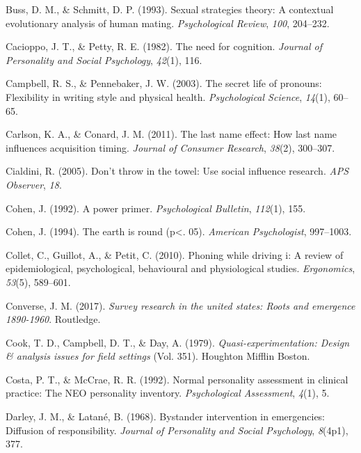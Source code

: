 \documentclass[
]{krantz}
\newlength{\cslhangindent}
\newenvironment{CSLReferences}[2] %
 {\begin{list}{}{%
  \setlength{\itemindent}{0pt}
  \setlength{\leftmargin}{0pt}
  \setlength{\parsep}{0pt}
  \ifodd #1
   \setlength{\leftmargin}{\cslhangindent}
   \setlength{\itemindent}{-1\cslhangindent}
  \fi
  \setlength{\itemsep}{#2\baselineskip}}}
 {\end{list}}
\begin{document}
\begin{CSLReferences}{1}{0}
Buss, D. M., \& Schmitt, D. P. (1993). Sexual strategies theory: A contextual evolutionary analysis of human mating. \emph{Psychological Review}, \emph{100}, 204--232.

Cacioppo, J. T., \& Petty, R. E. (1982). The need for cognition. \emph{Journal of Personality and Social Psychology}, \emph{42}(1), 116.

Campbell, R. S., \& Pennebaker, J. W. (2003). The secret life of pronouns: Flexibility in writing style and physical health. \emph{Psychological Science}, \emph{14}(1), 60--65.

Carlson, K. A., \& Conard, J. M. (2011). The last name effect: How last name influences acquisition timing. \emph{Journal of Consumer Research}, \emph{38}(2), 300--307.

Cialdini, R. (2005). Don't throw in the towel: Use social influence research. \emph{APS Observer}, \emph{18}.

Cohen, J. (1992). A power primer. \emph{Psychological Bulletin}, \emph{112}(1), 155.

Cohen, J. (1994). The earth is round (p\textless. 05). \emph{American Psychologist}, 997--1003.

Collet, C., Guillot, A., \& Petit, C. (2010). Phoning while driving i: A review of epidemiological, psychological, behavioural and physiological studies. \emph{Ergonomics}, \emph{53}(5), 589--601.

Converse, J. M. (2017). \emph{Survey research in the united states: Roots and emergence 1890-1960}. Routledge.

Cook, T. D., Campbell, D. T., \& Day, A. (1979). \emph{Quasi-experimentation: Design \& analysis issues for field settings} (Vol. 351). Houghton Mifflin Boston.

Costa, P. T., \& McCrae, R. R. (1992). Normal personality assessment in clinical practice: The NEO personality inventory. \emph{Psychological Assessment}, \emph{4}(1), 5.

Darley, J. M., \& Latané, B. (1968). Bystander intervention in emergencies: Diffusion of responsibility. \emph{Journal of Personality and Social Psychology}, \emph{8}(4p1), 377.


\end{CSLReferences}
\end{document}
